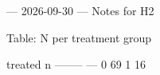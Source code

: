 --- 2026-09-30 ---
Notes for H2


Table: N per treatment group
 
  treated    n
 --------  ---
        0   69
        1   16


